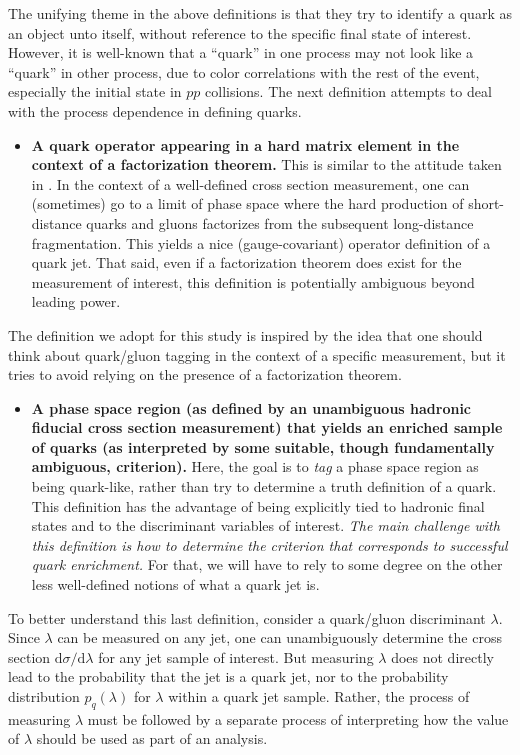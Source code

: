 \documentclass[11pt]{cernrep}
\begin{document}
The unifying theme in the above definitions is that they try to identify a quark as an object unto itself, without reference to the specific final state of interest.  However, it is well-known that a ``quark'' in one process may not look like a ``quark'' in other process, due to color correlations with the rest of the event, especially the initial state in $pp$ collisions.  The next definition attempts to deal with the process dependence in defining quarks. 
\begin{itemize}
\item \textbf{A quark operator appearing in a hard matrix element in the context of a factorization theorem.}  This is similar to the attitude taken in \cite{Gallicchio:2011xc}.  In the context of a well-defined cross section measurement, one can (sometimes) go to a limit of phase space where the hard production of short-distance quarks and gluons factorizes from the subsequent long-distance fragmentation.  This yields a nice (gauge-covariant) operator definition of a quark jet.  That said, even if a factorization theorem does exist for the measurement of interest, this definition is potentially ambiguous beyond leading power.
\end{itemize}
The definition we adopt for this study is inspired by the idea that one should think about quark/gluon tagging in the context of a specific measurement, but it tries to avoid relying on the presence of a factorization theorem.
\begin{itemize}
\item \textbf{A phase space region (as defined by an unambiguous
    hadronic fiducial cross section measurement) that yields an
    enriched sample of quarks (as interpreted by some suitable, though
    fundamentally ambiguous, criterion).}  Here, the goal is to
  \emph{tag} a phase space region as being quark-like, rather than try
  to determine a truth definition of a quark.  This definition has the
  advantage of being explicitly tied to hadronic final states and to
  the discriminant variables of interest. \emph{The main
  challenge with this definition is how to determine the criterion
  that corresponds to successful quark enrichment.}  For that, we will
  have to rely to some degree on the other less well-defined notions
  of what a quark jet is.
\end{itemize}

To better understand this last definition, consider a quark/gluon discriminant $\lambda$.  Since $\lambda$ can be measured on any jet, one can unambiguously determine the cross section $\text{d} \sigma / \text{d} \lambda$ for any jet sample of interest.  But measuring $\lambda$ does not directly lead to the probability that the jet is a quark jet, nor to the probability distribution  $p_q(\lambda)$ for $\lambda$ within a quark jet sample.  Rather, the process of measuring $\lambda$ must be followed by a separate process of interpreting how the value of $\lambda$ should be used as part of an analysis.
\end{document}
